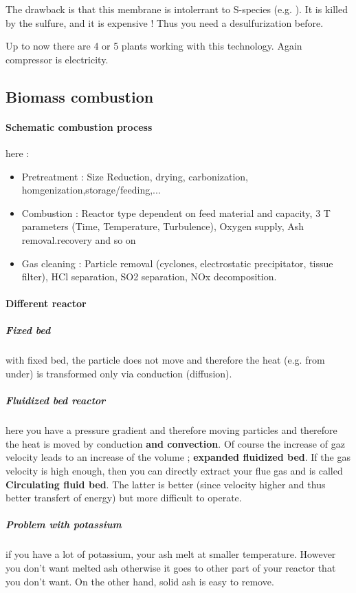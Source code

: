 \documentclass[10pt,a4paper]{article}
\begin{document}
The drawback is that this membrane is intolerrant to S-species (e.g. ). It is killed by the sulfure, and it is expensive ! Thus you need a desulfurization before.

Up to now there are 4 or 5 plants working with this technology. Again compressor is electricity.
\subsection{Biomass combustion}
\paragraph{Schematic combustion process} here :
\begin{itemize}
\item Pretreatment : Size Reduction, drying, carbonization, homgenization,storage/feeding,...
\item Combustion : Reactor type dependent on feed material and capacity, 3 T parameters (Time, Temperature, Turbulence), Oxygen supply, Ash removal.recovery and so on
\item Gas cleaning : Particle removal (cyclones, electrostatic precipitator, tissue filter), HCl separation, SO2 separation, NOx decomposition.
\end{itemize}

\paragraph{Different reactor}

\subparagraph{Fixed bed} with fixed bed, the particle does not move and therefore the heat (e.g. from under) is transformed only via conduction (diffusion).

\subparagraph{Fluidized bed reactor} here you have a pressure gradient and therefore moving particles and therefore the heat is moved by conduction \textbf{and convection}. Of course the increase of gaz velocity leads to an increase of the volume ; \textbf{expanded fluidized bed}. If the gas velocity is high enough, then you can directly extract your flue gas and is called \textbf{Circulating fluid bed}. The latter is better (since velocity higher and thus better transfert of energy) but more difficult to operate.

\subparagraph{Problem with potassium} if you have a lot of potassium, your ash melt at smaller temperature. However you don't want melted ash otherwise it goes to other part of your reactor that you don't want. On the other hand, solid ash is easy to remove.


\newpage




\end{document}
